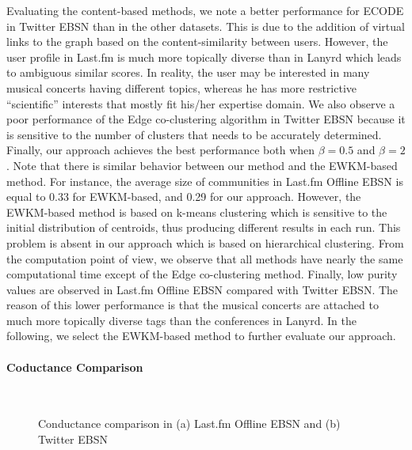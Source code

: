 Evaluating the content-based methods, we note a better performance for ECODE in Twitter EBSN than in the other datasets. This is due to the addition of virtual links to the graph based on the content-similarity between users. However, the user profile in Last.fm is much more topically diverse than in Lanyrd which leads to ambiguous similar scores. In reality, the user may be interested in many musical concerts having different topics, whereas he has more restrictive ``scientific'' interests that mostly fit his/her expertise domain. We also observe a poor performance of the Edge co-clustering algorithm in Twitter EBSN because it is sensitive to the number of clusters that needs to be accurately determined. Finally, our approach achieves the best performance both when $\beta=0.5$ and $\beta=2$. Note that there is similar behavior between our method and the EWKM-based method. For instance, the average size of communities in Last.fm Offline EBSN is equal to 0.33 for EWKM-based, and 0.29 for our approach. However, the EWKM-based method is based on k-means clustering which is sensitive to the initial distribution of centroids, thus producing different results in each run. This problem is absent in our approach which is based on hierarchical clustering. From the computation point of view, we observe that all methods have nearly the same computational time except of the Edge co-clustering method. Finally, low purity values are observed in Last.fm Offline EBSN compared with Twitter EBSN. The reason of this lower performance is that the musical concerts are attached to much more topically diverse tags than the conferences in Lanyrd. In the following, we select the EWKM-based method to further evaluate our approach.

\paragraph{Coductance Comparison} \mbox{}\\

\begin{figure}[htb]
\centering
{}
\caption{Conductance comparison in (a) Last.fm Offline EBSN and (b) Twitter EBSN}
\label{fig:conductance}
\end{figure}

